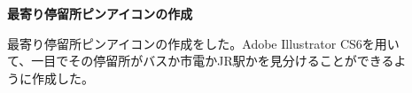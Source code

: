 ﻿\begin{description}
 \item[] \textbf{最寄り停留所ピンアイコンの作成}\par
 最寄り停留所ピンアイコンの作成をした。Adobe Illustrator CS6を用いて、一目でその停留所がバスか市電かJR駅かを見分けることができるように作成した。
  \par
\end{description}
